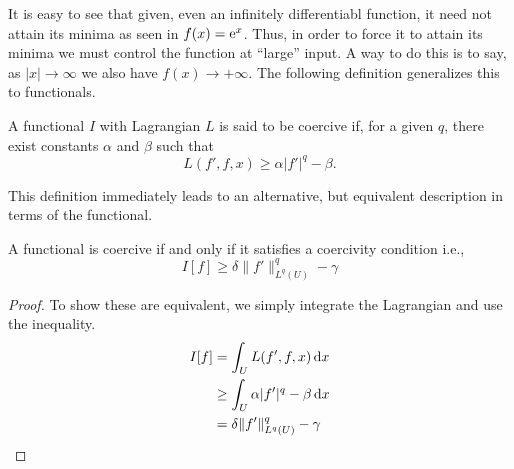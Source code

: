 It is easy to see that given, even an infinitely differentiabl function, it need not attain its minima as seen in $f(x) = \mathrm{e}^x$. Thus, in order to force it to attain its minima we must control the function at ``large'' input. A way to do this is to say, as $|x|\to \infty$ we also have $f(x)\to +\infty$. The following definition generalizes this to functionals. 

\begin{definition}\label{def:coercive}
A functional $I$ with Lagrangian $L$ is said to be coercive if, for a given $q$, there exist constants $\alpha$ and $\beta$ such that
\begin{equation}
L(f', f, x) \geq \alpha |f'|^q - \beta.
\end{equation}
\end{definition}
This definition immediately leads to an alternative, but equivalent description in terms of the functional.
\begin{lemma}
A functional is coercive if and only if it satisfies a coercivity condition i.e.,
\begin{equation}
I[f] \geq \delta \|f'\|^q_{L^q(U)} - \gamma
\end{equation}
\end{lemma}
\begin{proof}
To show these are equivalent, we simply integrate the Lagrangian and use the inequality.
\begin{align*}
I[f] & = \int_U L(f',f,x)\dd{x} \\
 & \geq \int_U \alpha |f'|^q - \beta \dd{x} \\
 & = \delta\|f'\|_{L^q(U)}^q - \gamma \qedhere
\end{align*}
\end{proof}
